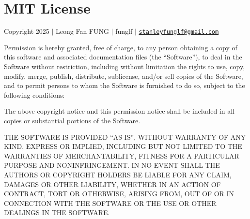 \chapter{MIT License }
\hypertarget{md__l_i_c_e_n_s_e}{}\label{md__l_i_c_e_n_s_e}
Copyright 2025 \texorpdfstring{$\vert$}{|} Leong Fan FUNG \texorpdfstring{$\vert$}{|} funglf \texorpdfstring{$\vert$}{|} \href{mailto:stanleyfunglf@gmail.com}{\texttt{stanleyfunglf@gmail.\+com}}

Permission is hereby granted, free of charge, to any person obtaining a copy of this software and associated documentation files (the “\+Software”), to deal in the Software without restriction, including without limitation the rights to use, copy, modify, merge, publish, distribute, sublicense, and/or sell copies of the Software, and to permit persons to whom the Software is furnished to do so, subject to the following conditions\+:

The above copyright notice and this permission notice shall be included in all copies or substantial portions of the Software.

THE SOFTWARE IS PROVIDED “\+AS IS”, WITHOUT WARRANTY OF ANY KIND, EXPRESS OR IMPLIED, INCLUDING BUT NOT LIMITED TO THE WARRANTIES OF MERCHANTABILITY, FITNESS FOR A PARTICULAR PURPOSE AND NONINFRINGEMENT. IN NO EVENT SHALL THE AUTHORS OR COPYRIGHT HOLDERS BE LIABLE FOR ANY CLAIM, DAMAGES OR OTHER LIABILITY, WHETHER IN AN ACTION OF CONTRACT, TORT OR OTHERWISE, ARISING FROM, OUT OF OR IN CONNECTION WITH THE SOFTWARE OR THE USE OR OTHER DEALINGS IN THE SOFTWARE. 